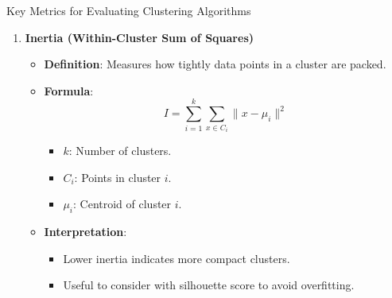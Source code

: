 \documentclass[aspectratio=169]{beamer}
\begin{document}
\begin{frame}[fragile]
\begin{block}{Key Metrics for Evaluating Clustering Algorithms}
\begin{enumerate}
            \item \textbf{Inertia (Within-Cluster Sum of Squares)}
            \begin{itemize}
                \item \textbf{Definition}: Measures how tightly data points in a cluster are packed. 
                \item \textbf{Formula}:
                \begin{equation}
                    I = \sum_{i=1}^{k} \sum_{x \in C_i} \|x - \mu_i\|^2
                \end{equation}
                \begin{itemize}
                    \item $k$: Number of clusters.
                    \item $C_i$: Points in cluster $i$.
                    \item $\mu_i$: Centroid of cluster $i$.
                \end{itemize}
                \item \textbf{Interpretation}:
                \begin{itemize}
                    \item Lower inertia indicates more compact clusters.
                    \item Useful to consider with silhouette score to avoid overfitting.
                \end{itemize}
            \end{itemize}
        \end{enumerate}
    \end{block}
\end{frame}
\end{document}
